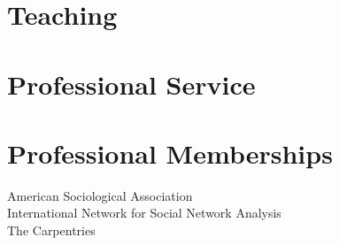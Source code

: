 \documentclass[11pt]{article} %
\begin{document}















\section*{Teaching}



\section*{Professional Service}






\section*{Professional Memberships}
American Sociological Association  \\ 
International Network for Social Network Analysis \\
The Carpentries 

\begin{comment}
Latino Soc               2021
Social Psych             2020 
Race                     2020 
Math Soc            2019 2020 
Medical             2019 2020 
Methods             2019  
Env Soc             2019  
World Systems       2019  
\end{comment}
\end{document}
